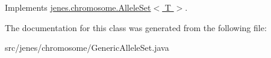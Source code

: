 Implements \hyperlink{interfacejenes_1_1chromosome_1_1_allele_set_3_01_t_01_4_74ab0cb120fcfdee8e878727d6c50815}{jenes.chromosome.AlleleSet$<$ T $>$}.

The documentation for this class was generated from the following file:\begin{CompactItemize}
\item 
src/jenes/chromosome/GenericAlleleSet.java\end{CompactItemize}
